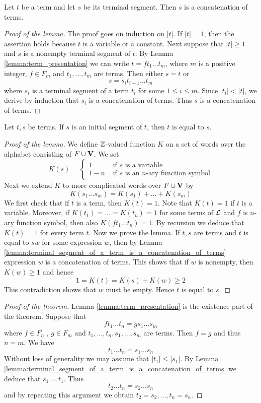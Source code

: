 \begin{lemma}\label{lemma:terminal_segment_of_a_term_is_a_concatenation_of_terms}
Let $t$ be a term and let $s$ be its terminal segment. Then $s$ is a concatenation of terms.
\end{lemma}
\begin{proof}[Proof of the lemma]
The proof goes on induction on $|t|$. If $|t| = 1$, then the assertion holds because $t$ is a variable or a constant. Next suppose that $|t| \geq 1$ and $s$ is a nonempty terminal segment of $t$. By Lemma \ref{lemma:term_presentation} we can write $t = ft_1...t_m$, where $m$ is a positive integer, $f \in F_m$ and $t_1,...,t_m$ are terms. Then
either $s = t$ or
$$s = s_it_{i+1}...t_m$$
where $s_i$ is a terminal segment of a term $t_i$ for some $1 \leq i \leq m$. Since $|t_i|<|t|$, we derive by induction that $s_i$ is a concatenation of terms. Thus $s$ is a concatenation of terms.
\end{proof}

\begin{lemma}
Let $t,s$ be terms. If $s$ is an initial segment of $t$, then $t$ is equal to $s$.
\end{lemma}
\begin{proof}[Proof of the lemma]
We define ${\mathbb Z}$-valued function $K$ on a set of words over the alphabet consisting of $F \cup \mathbf{V}$. We set
$$K(s) =\begin{cases}1 & \mbox{ if }s\mbox{ is a variable}\\
1-n & \mbox{ if }s\mbox{ is an $n$-ary function symbol}
\end{cases}$$
Next we extend $K$ to more complicated words over $F \cup \mathbf{V}$ by
$$K(s_1 ...s_m) = K(s_1) + ... + K(s_m)$$
We first check that if $t$ is a term, then $K(t) = 1$. Note that $K(t) = 1$ if $t$ is a variable. Moreover, if $K(t_1) = ... = K(t_n) = 1$ for some terms of ${\mathcal L}$ and $f$ is $n$-ary function symbol, then also $K( ft_1...t_n) = 1$.
By recursion we deduce that $K(t) = 1$ for every term $t$. Now we prove the lemma. If $t, s$ are terms and $t$ is equal to $sw$ for some expression $w$, then by Lemma \ref{lemma:terminal_segment_of_a_term_is_a_concatenation_of_terms} expression $w$ is a concatenation of terms. This shows that if $w$ is nonempty, then $K(w) \geq 1$ and hence
$$1 = K(t) = K(s) + K(w) \geq 2$$
This contradiction shows that $w$ must be empty. Hence $t$ is equal to $s$.
\end{proof}

\begin{proof}[Proof of the theorem]
Lemma \ref{lemma:term_presentation} is the existence part of the theorem. Suppose that
$$ft_1 ...t_n = gs_1 ...s_m$$
where $f \in F_n$ , $g \in F_m$ and $t_1, ..., t_n , s_1 , ..., s_m$ are terms. Then $f = g$ and thus $n = m$. We have
$$t_1 ...t_n = s_1 ...s_n$$
Without loss of generality we may assume that $|t_1| \leq |s_1|$. By Lemma \ref{lemma:terminal_segment_of_a_term_is_a_concatenation_of_terms} we deduce that $s_1 = t_1$.
Thus
$$t_2 ...t_n = s_2 ...s_n$$
and by repeating this argument we obtain $t_2 = s_2 ,...,t_n = s_n$.
\end{proof}
 
